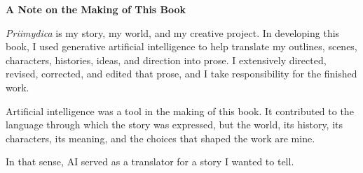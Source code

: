\documentclass[12pt]{article}
\begin{document}
\begin{titlepage}
\vspace*{\fill}
\begin{center}
\begin{minipage}{0.8\textwidth}

\begin{center}
\textbf{\large A Note on the Making of This Book}
\end{center}

\vspace{1.5em}

\noindent
\textit{Priimydica} is my story, my world, and my creative project. In developing this book, I used generative artificial intelligence to help translate my outlines, scenes, characters, histories, ideas, and direction into prose. I extensively directed, revised, corrected, and edited that prose, and I take responsibility for the finished work.

\vspace{1em}

\noindent
Artificial intelligence was a tool in the making of this book. It contributed to the language through which the story was expressed, but the world, its history, its characters, its meaning, and the choices that shaped the work are mine.

\vspace{1em}

\noindent
In that sense, AI served as a translator for a story I wanted to tell.

\vspace{2em}

\end{minipage}
\end{center}
\vspace*{\fill}
\end{titlepage}

\newpage
\end{document}
